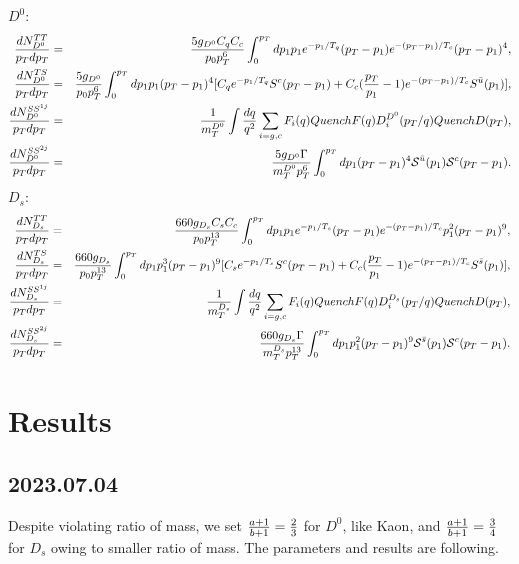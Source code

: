 \documentclass[onecolumn,aps,superscriptaddress,nofootinbib,floatfix]{revtex4}
\begin{document}
	$D^0$:
	\begin{eqnarray}
		\frac{dN^{TT}_{D^0}}{p_Tdp_T}&=&{5g_{D^0} C_q C_c\over p_0 p_T^6}\int_0^{p_T}dp_1 p_1 e^{-p_1/T_q} (p_T -p_1) e^{-(p_T -p_1)/T_c} (p_T -p_1)^4, \\
		\frac{dN^{TS}_{D^0}}{p_Tdp_T}&=&{5g_{D^0} \over p_0 p_T^6}\int_0^{p_T}dp_1 
		p_1(p_T -p_1)^4 [C_q e^{-p_1/T_q} S^c(p_T-p_1)+C_c({p_T\over p_1} -1) e^{-(p_T -p_1)/T_c}S^{\bar{u}}(p_1)] , \\
		\frac{dN^{SS^{1j}}_{D^0}}{p_Tdp_T}&=&{1\over m_T^{D^0}}\int {dq \over q^2}\sum_{i=g,c} F_i(q)QuenchF(q)D_i^{D^0}(p_T/q)QuenchD(p_T), \\
		\frac{dN^{SS^{2j}}_{D^0}}{p_Tdp_T}&=&{5g_{D^0}\Gamma \over m_T^{D^0}p_T^6}\int_{0}^{p_T}dp_1 (p_T-p_1)^4 \mathcal{S}^{\bar{u}}(p_1) \mathcal{S}^{c}(p_T-p_1).
	\end{eqnarray}
	$D_s$:
	\begin{eqnarray}
		\frac{dN^{TT}_{D_s}}{p_Tdp_T}&=&{660g_{D_s} C_s C_c\over p_0 p_T^{13}}\int_0^{p_T}dp_1 p_1 e^{-p_1/T_s} (p_T -p_1) e^{-(p_T -p_1)/T_c} p_1^2 (p_T -p_1)^9, \\
		\frac{dN^{TS}_{D_s}}{p_Tdp_T}&=&{660g_{D_s} \over p_0 p_T^{13}}\int_0^{p_T}dp_1 
		p_1^3(p_T -p_1)^9 [C_s e^{-p_1/T_s} S^c(p_T-p_1)+C_c({p_T\over p_1} -1) e^{-(p_T -p_1)/T_c}S^{\bar{s}}(p_1)] , \\
		\frac{dN^{SS^{1j}}_{D_s}}{p_Tdp_T}&=&{1\over m_T^{D_s}}\int {dq \over q^2}\sum_{i=g,c} F_i(q)QuenchF(q)D_i^{D_s}(p_T/q)QuenchD(p_T), \\
		\frac{dN^{SS^{2j}}_{D_s}}{p_Tdp_T}&=&{660g_{D_s}\Gamma \over m_T^{D_s}p_T^{13}}\int_{0}^{p_T}dp_1 p_1^2(p_T-p_1)^9 \mathcal{S}^{\bar{s}}(p_1) \mathcal{S}^{c}(p_T-p_1).
	\end{eqnarray}

\section{Results}
\subsection{2023.07.04}
Despite violating ratio of mass, we set ${a+1 \over b+1}={2\over 3}$ for $D^0$, like Kaon, and ${a+1 \over b+1}={3\over 4}$ for $D_s$ owing to smaller ratio of mass. The parameters and results are following.
\begin{table}[htbp]
	\centering
	\caption{Parameters used in v16, in which $\gamma_0$ and $q_0$ are only for charm quark.}
	\label{parameters0704}
\end{table}
\end{document}
